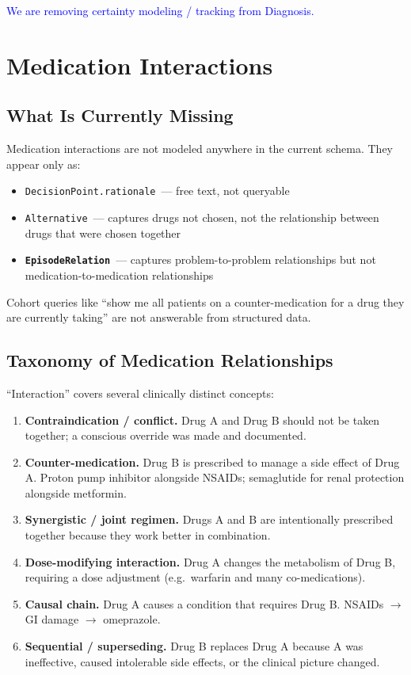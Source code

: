\documentclass[11pt]{article}
\newcommand{\entity}[1]{\texttt{\textbf{#1}}}
\newcommand{\field}[1]{\texttt{#1}}
\begin{document}
\textcolor{blue}{We are removing certainty modeling / tracking from Diagnosis.}

\section{Medication Interactions}
\label{sec:interactions}

\subsection{What Is Currently Missing}

Medication interactions are not modeled anywhere in the current schema.
They appear only as:

\begin{itemize}[noitemsep]
  \item \field{DecisionPoint.rationale}~--- free text, not queryable
  \item \field{Alternative}~--- captures drugs not chosen, not the
    relationship between drugs that were chosen together
  \item \entity{EpisodeRelation}~--- captures problem-to-problem
    relationships but not medication-to-medication relationships
\end{itemize}

Cohort queries like ``show me all patients on a counter-medication
for a drug they are currently taking'' are not answerable from
structured data.

\subsection{Taxonomy of Medication Relationships}

``Interaction'' covers several clinically distinct concepts:

\begin{enumerate}[noitemsep]
  \item \textbf{Contraindication / conflict.} Drug A and Drug B should
    not be taken together; a conscious override was made and documented.
  \item \textbf{Counter-medication.} Drug B is prescribed to manage a
    side effect of Drug A. Proton pump inhibitor alongside NSAIDs;
    semaglutide for renal protection alongside metformin.
  \item \textbf{Synergistic / joint regimen.} Drugs A and B are
    intentionally prescribed together because they work better in
    combination.
  \item \textbf{Dose-modifying interaction.} Drug A changes the
    metabolism of Drug B, requiring a dose adjustment (e.g.\ warfarin
    and many co-medications).
  \item \textbf{Causal chain.} Drug A causes a condition that requires
    Drug B. NSAIDs $\to$ GI damage $\to$ omeprazole.
  \item \textbf{Sequential / superseding.} Drug B replaces Drug A
    because A was ineffective, caused intolerable side effects, or the
    clinical picture changed.
\end{enumerate}
\end{document}
